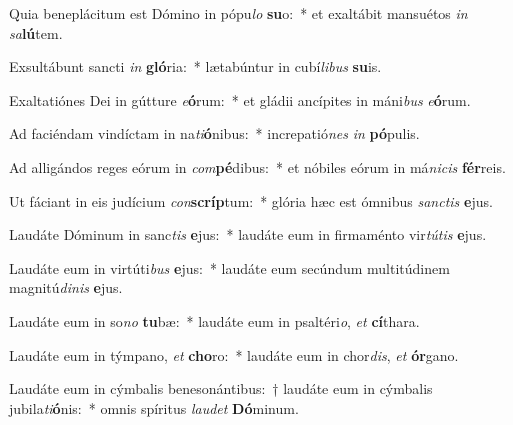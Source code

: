 \item Quia beneplácitum est Dómino in pópu\textit{lo} \textbf{su}o:~* et exaltábit mansuétos \textit{in} \textit{sa}\textbf{lú}tem.
\item Exsultábunt sancti \textit{in} \textbf{gló}ria:~* lætabúntur in cubí\textit{li}\textit{bus} \textbf{su}is.
\item Exaltatiónes Dei in gútture \textit{e}\textbf{ó}rum:~* et gládii ancípites in máni\textit{bus} \textit{e}\textbf{ó}rum.
\item Ad faciéndam vindíctam in na\textit{ti}\textbf{ó}nibus:~* increpatió\textit{nes} \textit{in} \textbf{pó}pulis.
\item Ad alligándos reges eórum in \textit{com}\textbf{pé}dibus:~* et nóbiles eórum in má\textit{ni}\textit{cis} \textbf{fér}reis.
\item Ut fáciant in eis judícium \textit{con}\textbf{scríp}tum:~* glória hæc est ómnibus \textit{sanc}\textit{tis} \textbf{e}jus.
\item Laudáte Dóminum in sanc\textit{tis} \textbf{e}jus:~* laudáte eum in firmaménto vir\textit{tú}\textit{tis} \textbf{e}jus.
\item Laudáte eum in virtúti\textit{bus} \textbf{e}jus:~* laudáte eum secúndum multitúdinem magnitú\textit{di}\textit{nis} \textbf{e}jus.
\item Laudáte eum in so\textit{no} \textbf{tu}bæ:~* laudáte eum in psaltéri\textit{o}, \textit{et} \textbf{cí}thara.
\item Laudáte eum in týmpano, \textit{et} \textbf{cho}ro:~* laudáte eum in chor\textit{dis}, \textit{et} \textbf{ór}gano.
\item Laudáte eum in cýmbalis benesonántibus:~† laudáte eum in cýmbalis jubila\textit{ti}\textbf{ó}nis:~* omnis spíritus \textit{lau}\textit{det} \textbf{Dó}minum.
